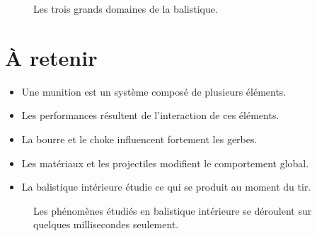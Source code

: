 \begin{figure}[htbp]
\centering


\caption{Les trois grands domaines de la balistique.}
\label{fig:domaines_balistique}

\end{figure}


\section{À retenir}

\begin{aretenir}

\begin{itemize}
    \item Une munition est un système composé de plusieurs éléments.
    \item Les performances résultent de l'interaction de ces éléments.
    \item La bourre et le choke influencent fortement les gerbes.
    \item Les matériaux et les projectiles modifient le comportement global.
    \item La balistique intérieure étudie ce qui se produit au moment du tir.
\end{itemize}

\end{aretenir}

\begin{figure}[htbp]
\centering


\caption{Les phénomènes étudiés en balistique intérieure se déroulent sur quelques millisecondes seulement.}
\label{fig:quelques_millisecondes}

\end{figure}
